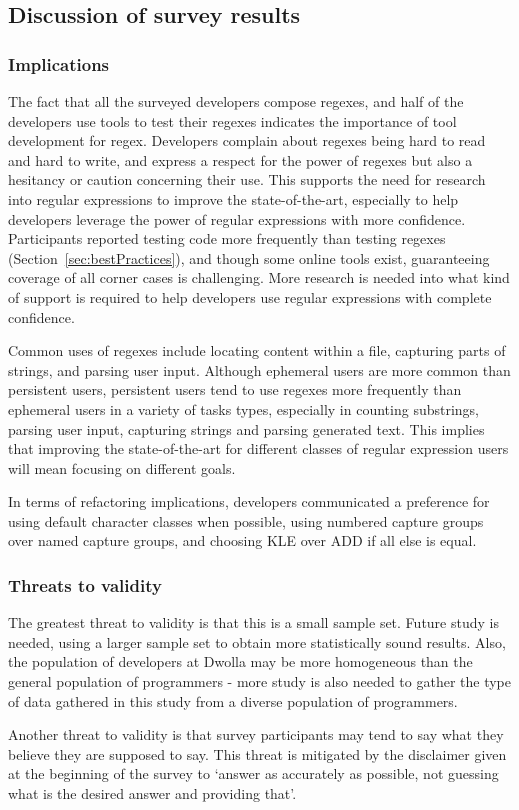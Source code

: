 \subsection{Discussion of survey results}

\subsubsection{Implications}
The fact that all the surveyed developers compose regexes, and half of the developers use tools to test their regexes indicates the importance of tool development for regex.  Developers complain about regexes being hard to read and hard to write, and express a respect for the power of regexes but also a hesitancy or caution concerning their use.  This supports the need for research into regular expressions to improve the state-of-the-art, especially to help developers leverage the power of regular expressions with more confidence.  Participants reported testing code more frequently than testing regexes (Section~\ref{sec:bestPractices}), and though some online tools exist, guaranteeing coverage of all corner cases is challenging.  More research is needed into what kind of support is required to help developers use regular expressions with complete confidence.

Common uses of regexes include locating content within a file, capturing parts of strings, and parsing user input.  Although ephemeral users are more common than persistent users, persistent users tend to use regexes more frequently than ephemeral users in a variety of tasks types, especially in counting substrings, parsing user input, capturing strings and parsing generated text.  This implies that improving the state-of-the-art for different classes of regular expression users will mean focusing on different goals.

In terms of refactoring implications, developers communicated a preference for using default character classes when possible, using numbered capture groups over named capture groups, and choosing KLE over ADD if all else is equal.

\subsubsection{Threats to validity}
The greatest threat to validity is that this is a small sample set.  Future study is needed, using a larger sample set to obtain more statistically sound results.  Also, the population of developers at Dwolla may be more homogeneous than the general population of programmers - more study is also needed to gather the type of data gathered in this study from a diverse population of programmers.

Another threat to validity is that survey participants may tend to say what they believe they are supposed to say.  This threat is mitigated by the disclaimer given at the beginning of the survey to `answer as accurately as possible, not guessing what is the desired answer and providing that'.


